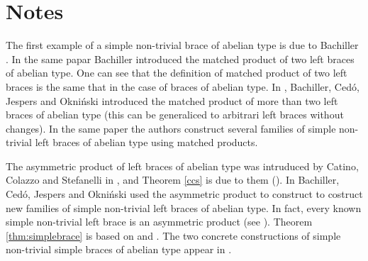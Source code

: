 \begin{prob}
\end{prob}

\begin{prob}
\end{prob}


\section*{Notes}

The first example of a simple non-trivial brace of abelian type is due to Bachiller \cite{MR3763276}. 
In the same papar Bachiller introduced the matched product of two left braces of abelian type. One can see that the definition of matched product of two left braces is the same that in the case of braces of abelian type. 
In \cite{MR3812099}, Bachiller, Ced\'o, Jespers and Okni\'{n}ski introduced the matched product of more than two left braces of abelian type (this can be generaliced to arbitrari left braces without changes). In the same paper the authors construct several families of  simple non-trivial left braces of abelian type using matched products.

The asymmetric product of left braces of abelian type was intruduced by Catino, Colazzo and Stefanelli in \cite{MR3478858}, and Theorem \ref{ccs} is due to them (\cite[Theorem 3]{MR3478858}).  In \cite{MR4020748} Bachiller, Ced\'o, Jespers and Okni\'{n}ski used the asymmetric product to construct to costruct new families of simple non-trivial left braces of abelian type. In fact, every known simple non-trivial left brace is an asymmetric product (see \cite{MR4020748, MR4161288, MR4122077}).
Theorem \ref{thm:simplebrace} is based on \cite[Theorem 3.6]{MR3812099} and \cite[Theorem 6.2]{MR4020748}. The two concrete constructions of simple non-trivial simple braces of abelian type appear in \cite{MR3812099,  MR4161288}.
